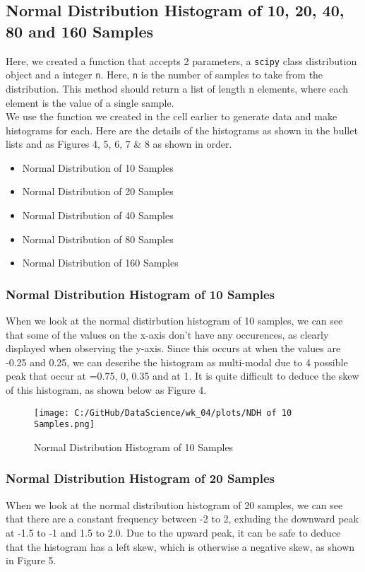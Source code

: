 \documentclass[a4paper,twocolumn]{article}
\begin{document}
\subsection{Normal Distribution Histogram of 10, 20, 40, 80 and 160 Samples}
Here, we created a function that accepts 2 parameters, a \texttt{scipy} class distribution object and a integer 
\texttt{n}. Here, \texttt{n} is the number of samples to take from the distribution. This method should return a 
list of length n elements, where each element is the value of a single sample. \\

We use the function we created in the cell earlier to generate data and make histograms for each. Here are the 
details of the histograms as shown in the bullet lists and as Figures 4, 5, 6, 7 \& 8 as shown in order.

\begin{itemize}
    \item Normal Distribution of 10 Samples
    \item Normal Distribution of 20 Samples
    \item Normal Distribution of 40 Samples
    \item Normal Distribution of 80 Samples
    \item Normal Distribution of 160 Samples
\end{itemize}

\newpage

\subsubsection{Normal Distribution Histogram of 10 Samples}
When we look at the normal distirbution histogram of 10 samples, we can see that some of the values on the x-axis
don't have any occurences, as clearly displayed when observing the y-axis. Since this occurs at when the values are 
-0.25 and 0.25, we can describe the histogram as multi-modal due to 4 possible peak that occur at =0.75, 0, 0.35 and
at 1. It is quite difficult to deduce the skew of this histogram, as shown below as Figure 4.

\begin{figure}[htbp] 
    \centering
    \noindent
    \texttt{[image: C:/GitHub/DataScience/wk\_04/plots/NDH of 10 Samples.png]}
    \caption{Normal Distribution Histogram of 10 Samples} 
\end{figure}

\subsubsection{Normal Distribution Histogram of 20 Samples}
When we look at the normal distribution histogram of 20 samples, we can see that there are a constant frequency 
between -2 to 2, exluding the downward peak at -1.5 to -1 and 1.5 to 2.0. Due to the upward peak, it can be safe
to deduce that the histogram has a left skew, which is otherwise a negative skew, as shown in Figure 5.
\end{document}
